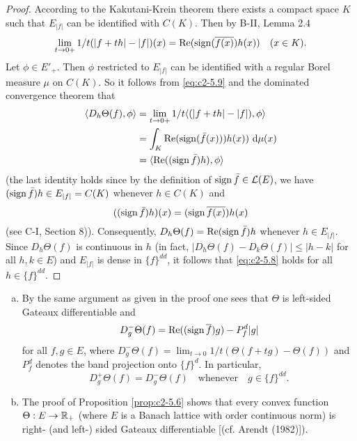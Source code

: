 \begin{proof}
According to the Kakutani-Krein theorem there exists a compact space
$K$ such that $E_{|f|}$ can be identified with $C(K)$. Then by B-II,
Lemma 2.4
\begin{equation}\label{eq:c2-5.9}
\lim_{t \to 0+} 1/t(|f+th| - |f|)(x) = \mathop{}\!\mathrm{Re}(\operatorname{sign} (\overline{f(x)})h(x)) \quad (x \in K).
\end{equation}
Let $\phi \in E'_{+}$. Then $\phi$ restricted to $E_{|f|}$ can be identified with a regular Borel measure $\mu$ on $C(K)$.
So it follows from \eqref{eq:c2-5.9} and the dominated convergence theorem that
\begin{align*}
\langle D_{h}\Theta(f),\phi \rangle &= \lim_{t \to 0+} 1/t \langle(|f + th| - |f|),\phi \rangle\\
&= \int_{K} \mathop{}\!\mathrm{Re}(\operatorname{sign} (\bar{f}(x)))h(x)) \, \mathop{}\!\mathrm{d}{\mu(x)} \\
&= \langle\mathop{}\!\mathrm{Re}((\operatorname{sign}  \bar{f})h),\phi\rangle
\end{align*}
(the last identity holds since by the definition of $\operatorname{sign}  \bar{f} \in \mathcal{L}(E)$,
we have $(\operatorname{sign}  \bar{f})h \in E_{|f|} = C(K)$ whenever $h \in C(K)$ and
\[
((\operatorname{sign}  \bar{f})h)(x) = (\operatorname{sign}  \overline{f(x)})h(x)
\]
(see C-I, Section 8)).
Consequently, $D_{h}\Theta(f) = \mathop{}\!\mathrm{Re}(\operatorname{sign}  \bar{f})h$ whenever $h \in E_{|f|}$. 
Since $D_{h}\Theta(f)$ is continuous in $h$ (in fact, $|D_{h}\Theta(f) - D_{k}\Theta(f)| \leq |h - k|$ for all $h,k \in E$) and $E_{|f|}$ is dense in $\{f\}^{dd}$, it follows that \eqref{eq:c2-5.8} holds for all $h \in \{f\}^{dd}$.
\end{proof}

\begin{remark}\label{rem:c2-5.7}
\begin{enumerate}[a), wide, labelsep=1em, itemindent=\parindent]
\item \label{rem:c2-5.7-1}
By the same argument as given in the proof one sees
that $\Theta$ is left-sided Gateaux differentiable and
\begin{equation*}
D^{-}_{g}\Theta(f) = \mathop{}\!\mathrm{Re}((\operatorname{sign}  \overline{f})g) - P^{d}_{f}|g|
\end{equation*}
for all $f, g \in E$, where $D^{-}_{g}\Theta(f) = \lim_{t \to 0} 1/t(\Theta(f + tg) - \Theta(f))$ and
$P^{d}_{f}$ denotes the band projection onto $\{f\}^{d}$. 
In particular,
\begin{equation}\label{eq:c2-5.10}
D^{+}_{g}\Theta(f) = D^{-}_{g}\Theta(f) \quad \text{whenever} \quad g \in \{f\}^{dd}.
\end{equation}
\item \label{rem:c2-5.7-2}
The proof of  Proposition \ref{prop:c2-5.6}   shows that every convex function $\Theta : E \to \mathbb{R}_{+}$
(where $E$ is a Banach lattice with order continuous norm) is right- (and left-) sided Gateaux differentiable [(cf. Arendt (1982)]).
\end{enumerate}
\end{remark}


